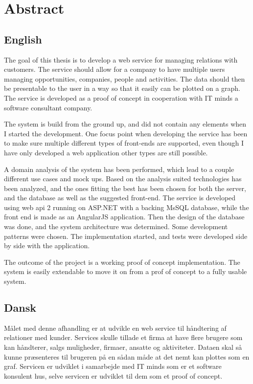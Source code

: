 \chapter{Abstract}
\label{chap:Abstract}

\section*{English}
The goal of this thesis is to develop a web service for managing relations with
customers. The service should allow for a company to have multiple users
managing opportunities, companies, people and activities. The data should then
be presentable to the user in a way so that it easily can be plotted on a graph.
The service is developed as a proof of concept in cooperation with IT minds a software consultant
company.

The system is build from the ground up, and did not contain any elements when I
started the development. One focus point when developing the service has been to
make sure multiple different types of front-ends are supported, even though I
have only developed a web application other types are still possible.

A domain analysis of the system has been performed, which lead to a couple
different use cases and mock ups. Based on the analysis suited technologies has
been analyzed, and the ones fitting the best has been chosen for both the
server, and the database as well as the suggested front-end. The service is
developed using web api 2 running on ASP.NET with a backing MsSQL database,
while the front end is made as an AngularJS application. Then the design of the
database was done, and the system architecture was determined. Some development
patterns were chosen. The implementation started, and tests were developed side
by side with the application. 

The outcome of the project is a working proof of concept implementation. The
system is easily extendable to move it on from a prof of concept to a fully
usable system. 

\clearpage
\section*{Dansk}
Målet med denne afhandling er at udvikle en web service til håndtering af
relationer med kunder. Services skulle tillade et firma at have flere brugere
som kan håndterer, salgs muligheder, firmaer, ansatte og aktiviteter. Dataen
skal så kunne præsenteres til brugeren på en sådan måde at det nemt kan
plottes som en graf. Servicen er udviklet i samarbejde med IT minds som er et
software konsulent hus, selve servicen er udviklet til dem som et proof of concept.

